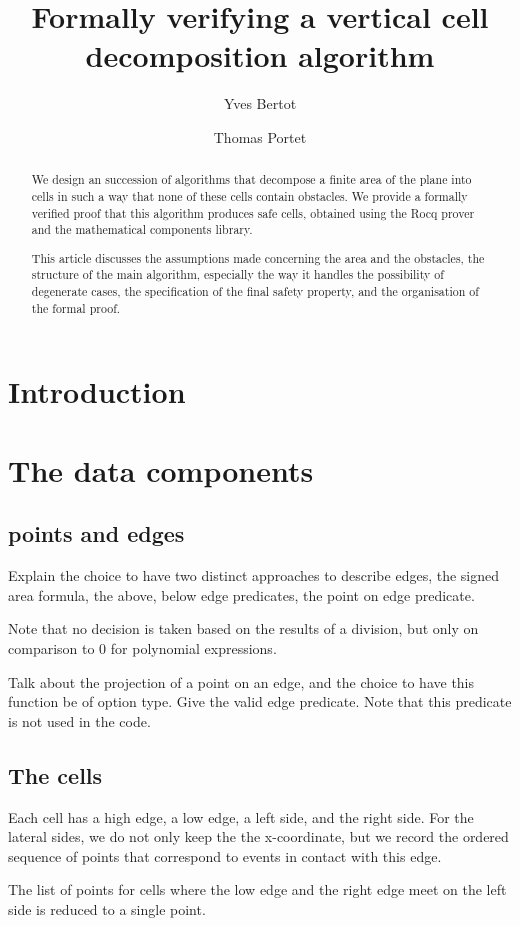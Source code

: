 \documentclass[a4paper, USenglish, cleveref, autoref, thm-restate]{lipics-v2021}
\title{Formally verifying a vertical cell decomposition algorithm}
\author{Yves Bertot}{Inria Center at Université Côte d'Azur, France}
       {yves.bertot@inria.fr}
       {https://orcid.org/0000-0001-5052-3019}{}
\author{Thomas Portet}{Inria Center at Université Côte d'Azur, France}
       {thomas.portet@inria.fr}
       {}{}
\begin{document}
\maketitle

\begin{abstract}
We design an succession of algorithms that decompose a finite area of the
plane into cells in such a way that none of these cells contain obstacles.
We provide a formally verified proof that this algorithm produces safe cells,
obtained using the Rocq prover and the mathematical components library.

This article discusses the assumptions made concerning the area and the
obstacles, the structure of the main algorithm, especially the way it handles
the possibility of degenerate cases, the specification of the final safety
property, and the organisation of the formal proof.
\end{abstract}

\section{Introduction}

\section{The data components}
\subsection{points and edges}
Explain the choice to have two distinct approaches to describe edges,
the signed area formula, the above, below edge predicates, the point
on edge predicate.

Note that no decision is taken based on the results of a division, but
only on comparison to 0 for polynomial expressions.

Talk about the projection of a point on an edge, and the choice to
have this function be of option type.   Give the valid edge predicate.
Note that this predicate is not used in the code.
\subsection{The cells}
Each cell has a high edge, a low edge, a left side, and the right side.  For
the lateral sides, we do not only keep the the x-coordinate, but we record
the ordered sequence of points that correspond to events in contact with this
edge.

The list of points for cells where the low edge and the right edge
meet on the left side is reduced to a single point.
\end{document}
